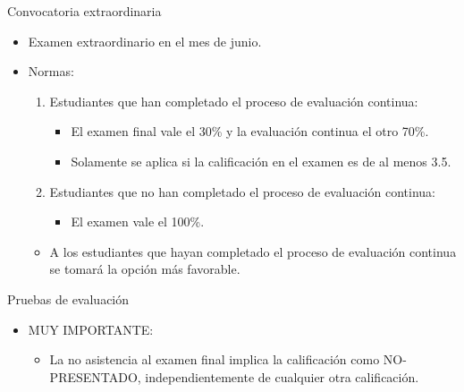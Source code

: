 \begin{frame}[t]{Convocatoria extraordinaria}
\begin{itemize}
  \item Examen extraordinario en el mes de junio.
  \vspace{1em}
  \item Normas:
    \begin{enumerate}
      \item Estudiantes que han completado el proceso de evaluación continua:
        \begin{itemize}
          \item El examen final vale el 30\% y la evaluación continua el otro 70\%.
          \item Solamente se aplica si la calificación en el examen es de al menos 3.5.
        \end{itemize}
      \item Estudiantes que no han completado el proceso de evaluación continua:
        \begin{itemize}
          \item El examen vale el 100\%.
        \end{itemize}
    \end{enumerate}
    \begin{itemize}
      \item A los estudiantes que hayan completado el proceso de evaluación continua se tomará la opción más favorable.
    \end{itemize}
\end{itemize}
\end{frame}

\begin{frame}[t]{Pruebas de evaluación}
\begin{itemize}
  \item \alert{MUY IMPORTANTE}:
    \begin{itemize}
      \item La no asistencia al examen final implica la calificación como NO-PRESENTADO, independientemente de cualquier otra calificación.
    \end{itemize}
\end{itemize}
\end{frame}
